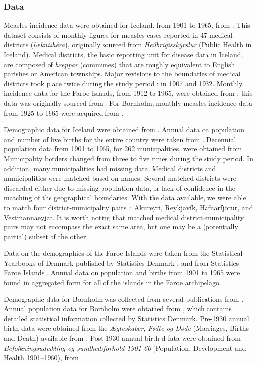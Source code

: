 \documentclass[10pt]{article}
\begin{document}
\subsubsection*{Data}

Measles incidence data were obtained for Iceland, from 1901 to 1965, from \cite{Cliff1981}. This dataset consists of monthly figures for measles cases reported in 47 medical districts (\textit{l\ae knish\'{e}ra\dh{}}), originally sourced from \textit{Heilbrig\dh{}issk\'{y}rslur} (Public Health in Iceland). Medical districts, the basic reporting unit for disease data in Iceland, are composed of \textit{hreppar} (communes) that are roughly equivalent to English parishes or American townships. Major revisions to the boundaries of medical districts took place twice during the study period : in 1907 and 1932. Monthly incidence data for the Faroe Islands, from 1912 to 1965, were obtained from \cite{Cliff2000}; this data was originally sourced from \cite{Lancaster1990}. For Bornholm, monthly measles incidence data from 1925 to 1965 were acquired from \cite{Kingdom}.

Demographic data for Iceland were obtained from \cite{StatsIceland}. Annual data on population and number of live births for the entire country were taken from \cite{StatsIcelandBirths}. Decennial population data from 1901 to 1965, for 262 municipalities, were obtained from \cite{StatsIcelandPop}. Municipality borders changed from three to five times during the study period. In addition, many municipalities had missing data. Medical districts and municipalities were matched based on names. Several matched districts were discarded either due to missing population data, or lack of confidence in the matching of the geographical boundaries. With the data available, we were able to match four district-municipality pairs~: Akureyri, Reykjav\'{i}k, Hafnarfj\"{o}r\dh{}ur, and Vestmannaeyjar. It is worth noting that matched medical district--municipality pairs may not encompass the exact same area, but one may be a (potentially partial) subset of the other. 

Data on the demographics of the Faroe Islands were taken from the Statistical Yearbooks of Denmark published by Statistics Denmark \cite{StatsDenmark}, and from Statistics Faroe Islands \cite{StatsFaroe}. Annual data on population and births from 1901 to 1965 were found in aggregated form for all of the islands in the Faroe archipelago. 

Demographic data for Bornholm was collected from several publications from \cite{StatsDenmark}. Annual population data for Bornholm were obtained from \cite{StatsDenmarkPop}, which contains detailed statistical information collected by Statistics Denmark. Pre-1930 annual birth data were obtained from the \textit{\AE{}gteskaber, F\o{}dte og D\o{}de} (Marriages, Births and Death) available from \cite{StatsDenmarkBirths1}. Post-1930 annual birth d fata were obtained from \textit{Befolkningsudvikling og sundhedsforhold 1901-60} (Population, Development and Health 1901--1960), from \cite{StatsDenmarkBirths2}.
\end{document}
